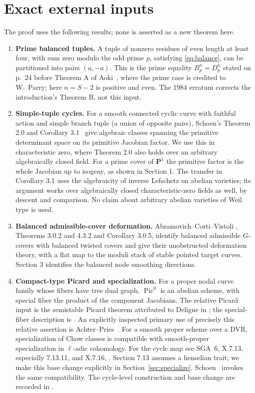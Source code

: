 \documentclass[11pt]{article}
\theoremstyle{definition}
\newcommand{\Pic}{\operatorname{Pic}}
\begin{document}
\section{Exact external inputs}\label{sec:inputs}
The proof uses the following results; none is asserted as a new theorem here.
\begin{enumerate}
\item \textbf{Prime balanced tuples.} A tuple of nonzero residues of even
length at least four, with sum zero modulo the odd prime $p$, satisfying
\eqref{eq:balance}, can be partitioned into pairs $(a,-a)$. This is the
prime equality $B_p^n=D_p^n$ stated on p.~24 before Theorem A of
Aoki~\cite{Aoki}, where the prime case is credited to W.~Parry; here
$n=S-2$ is positive and even. The 1984 erratum corrects the introduction's
Theorem B, not this input.
\item \textbf{Simple-tuple cycles.} For a smooth connected cyclic curve with
faithful action and simple branch tuple (a union of opposite pairs), Schoen's
Theorem 2.0 and Corollary 3.1~\cite{Schoen} give algebraic classes spanning the
primitive determinant space on its primitive Jacobian factor. We use this in
characteristic zero, where Theorem 2.0 also holds over an arbitrary algebraically
closed field. For a prime cover of $\mathbf P^1$ the primitive factor is the
whole Jacobian up to isogeny, as shown in Section 1. The transfer in Corollary
3.1 uses the algebraicity of inverse Lefschetz on abelian varieties; its argument
works over algebraically closed characteristic-zero fields as well, by descent
and comparison. No claim about arbitrary abelian varieties of Weil type is used.
\item \textbf{Balanced admissible-cover deformation.} Abramovich--Corti--Vistoli
\cite{ACV}, Theorems 3.0.2 and 4.3.2 and Corollary 3.0.5, identify balanced
admissible $G$-covers with balanced twisted covers and give their unobstructed
deformation theory, with a flat map to the moduli stack of stable pointed
target curves. Section 3 identifies the balanced node smoothing directions.
\item \textbf{Compact-type Picard and specialization.} For a proper nodal
curve family whose fibers have tree dual graph, $\Pic^0$ is an abelian scheme,
with special fiber the product of the component Jacobians. The relative Picard
input is the semistable Picard theorem attributed to Deligne in
\cite[\S9.4, Theorem 1, p.~259]{BLR}; the special-fiber description is
\cite[\S9.2, Example 8, pp.~246--247]{BLR}. An explicitly inspected primary use of precisely
this relative assertion is Achter--Pries~\cite[\S3.1]{AP}.
For a smooth proper scheme over a DVR, specialization of Chow classes is
compatible with smooth-proper specialization in $\ell$-adic cohomology.
For the cycle map see SGA~6, X.7.13, especially 7.13.11, and X.7.16,
\cite[pp.~576--579, 585]{SGA6}. Section 7.13 assumes a henselian trait;
we make this base change explicitly in Section~\ref{sec:specialize}.
Schoen~\cite[pp.~30--31]{Schoen} invokes the same compatibility.
The cycle-level construction and base change
are recorded in \cite[Tags 0H4H, 0H4M]{Stacks}.
\end{enumerate}
\end{document}
